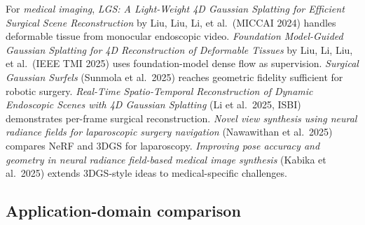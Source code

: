 \documentclass{article}
\begin{document}
For \emph{medical imaging}, \emph{LGS: A Light-Weight 4D Gaussian Splatting for Efficient Surgical Scene Reconstruction} by Liu, Liu, Li, et al.~(MICCAI 2024) \cite{liu2024lgsalightweight4dg} handles deformable tissue from monocular endoscopic video. \emph{Foundation Model-Guided Gaussian Splatting for 4D Reconstruction of Deformable Tissues} by Liu, Li, Liu, et al.~(IEEE TMI 2025) \cite{liu2025asurveyof3dreconst} uses foundation-model dense flow as supervision. \emph{Surgical Gaussian Surfels} (Sunmola et al.~2025) reaches geometric fidelity sufficient for robotic surgery. \emph{Real-Time Spatio-Temporal Reconstruction of Dynamic Endoscopic Scenes with 4D Gaussian Splatting} (Li et al.~2025, ISBI) demonstrates per-frame surgical reconstruction. \emph{Novel view synthesis using neural radiance fields for laparoscopic surgery navigation} (Nawawithan et al.~2025) compares NeRF and 3DGS for laparoscopy. \emph{Improving pose accuracy and geometry in neural radiance field-based medical image synthesis} (Kabika et al.~2025) extends 3DGS-style ideas to medical-specific challenges.

\subsection{Application-domain comparison}\label{application-domain-comparison}
\end{document}
